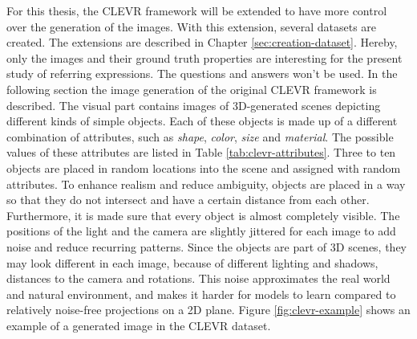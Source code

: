 For this thesis, the CLEVR framework will be extended to have more control over the generation of the images.
With this extension, several datasets are created.
The extensions are described in Chapter \ref{sec:creation-dataset}.
Hereby, only the images and their ground truth properties are interesting for the present study of referring expressions.
The questions and answers won't be used.
In the following section the image generation of the original CLEVR framework is described.
The visual part contains images of 3D-generated scenes depicting different kinds of simple objects.
Each of these objects is made up of a different combination of attributes, such as \emph{shape}, \emph{color}, \emph{size} and \emph{material}.
The possible values of these attributes are listed in Table \ref{tab:clevr-attributes}.
Three to ten objects are placed in random locations into the scene and assigned with random attributes.
To enhance realism and reduce ambiguity, objects are placed in a way so that they do not intersect and have a certain distance from each other.
Furthermore, it is made sure that every object is almost completely visible.
The positions of the light and the camera are slightly jittered for each image to add noise and reduce recurring patterns.
Since the objects are part of 3D scenes, they may look different in each image, because of different lighting and shadows, distances to the camera and rotations.
This noise approximates the real world and natural environment, and makes it harder for models to learn compared to relatively noise-free projections on a 2D plane.
Figure \ref{fig:clevr-example} shows an example of a generated image in the CLEVR dataset.

